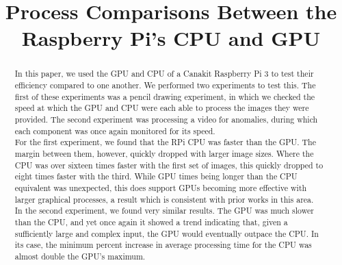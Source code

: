\documentclass[conference]{IEEEtran}
\begin{document}
\title{Process Comparisons Between the Raspberry Pi's CPU and GPU\\}

\author{
\and
{}
}

\maketitle


\begin{abstract}
In this paper, we used the GPU and CPU of a Canakit Raspberry Pi 3 to test their efficiency compared to one another. We performed two experiments to test this. The first of these experiments was a pencil drawing experiment, in which we checked the speed at which the GPU and CPU were each able to process the images they were provided. The second experiment was processing a video for anomalies, during which each component was once again monitored for its speed.\\
For the first experiment, we found that the RPi CPU was faster than the GPU. The margin between them, however, quickly dropped with larger image sizes. Where the CPU was over sixteen times faster with the first set of images, this quickly dropped to eight times faster with the third. While GPU times being longer than the CPU equivalent was unexpected, this does support GPUs becoming more effective with larger graphical processes, a result which is consistent with prior works in this area. \\
In the second experiment, we found very similar results. The GPU was much slower than the CPU, and yet once again it showed a trend indicating that, given a sufficiently large and complex input, the GPU would eventually outpace the CPU. In its case, the minimum percent increase in average processing time for the CPU was almost double the GPU's maximum.
\end{abstract}
\end{document}
